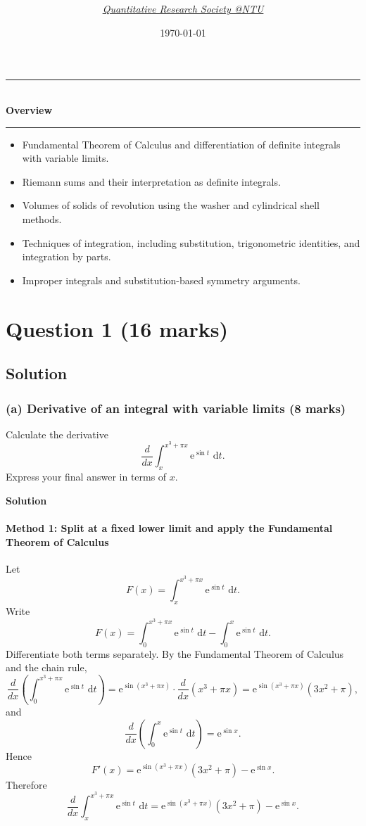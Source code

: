 \documentclass[12pt]{article}
\title{
\Huge \CourseCode\ \CourseName \\[0.3em]
\Large \DocType \\[0.3em]
\large \ExamMeta
}
\author{
  \textit{\href{https://qrsntu.org}{Quantitative Research Society @NTU}}
}
\date{\today}
\newcommand{\dd}{\,\mathrm{d}}
\newcommand{\ee}{\mathrm{e}}
\newenvironment{overview}{
  \par\bigskip
  \begin{center}
    \rule{0.92\linewidth}{0.6pt}\\[-0.2em]
    \textbf{Overview}\\[-0.2em]
    \rule{0.92\linewidth}{0.6pt}
  \end{center}
  \vspace{-0.3em}
  \begin{itemize}[leftmargin=1.6em, itemsep=0.2em, topsep=0.2em]
}{
  \end{itemize}
  \par\bigskip
}
\begin{document}
\maketitle
\thispagestyle{plainfirst}
\pagestyle{main}

\begin{overview}
  \item Fundamental Theorem of Calculus and differentiation of definite integrals with variable limits.
  \item Riemann sums and their interpretation as definite integrals.
  \item Volumes of solids of revolution using the washer and cylindrical shell methods.
  \item Techniques of integration, including substitution, trigonometric identities, and integration by parts.
  \item Improper integrals and substitution-based symmetry arguments.
\end{overview}

\newpage
\tableofcontents
\newpage

\section[Question 1 (16 marks)]{Question 1 \hfill (16 marks)}

\subsection{Solution}

\subsubsection{(a) Derivative of an integral with variable limits \hfill (8 marks)}

Calculate the derivative
\[
\frac{d}{dx}\int_{x}^{x^3+\pi x} \ee^{\sin t}\,\dd t.
\]
Express your final answer in terms of \(x\).

\textbf{Solution}

\paragraph{Method 1: Split at a fixed lower limit and apply the Fundamental Theorem of Calculus}
Let
\[
F(x)=\int_{x}^{x^3+\pi x} \ee^{\sin t}\,\dd t.
\]
Write
\[
F(x)=\int_{0}^{x^3+\pi x} \ee^{\sin t}\,\dd t-\int_{0}^{x} \ee^{\sin t}\,\dd t.
\]
Differentiate both terms separately. By the Fundamental Theorem of Calculus and the chain rule,
\[
\frac{d}{dx}\left(\int_{0}^{x^3+\pi x} \ee^{\sin t}\,\dd t\right)
=\ee^{\sin(x^3+\pi x)}\cdot \frac{d}{dx}(x^3+\pi x)
=\ee^{\sin(x^3+\pi x)}(3x^2+\pi),
\]
and
\[
\frac{d}{dx}\left(\int_{0}^{x} \ee^{\sin t}\,\dd t\right)=\ee^{\sin x}.
\]
Hence
\[
F'(x)=\ee^{\sin(x^3+\pi x)}(3x^2+\pi)-\ee^{\sin x}.
\]
Therefore
\[
\boxed{\frac{d}{dx}\int_{x}^{x^3+\pi x} \ee^{\sin t}\,\dd t
=\ee^{\sin(x^3+\pi x)}(3x^2+\pi)-\ee^{\sin x}.}
\]
\end{document}
